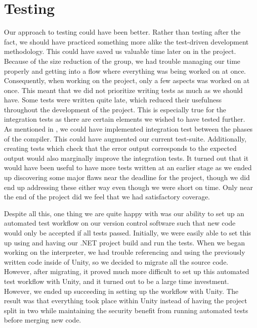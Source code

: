 \section{Testing}
Our approach to testing could have been better. Rather than testing after the fact, we should have practiced something more alike the test-driven development methodology. This could have saved us valuable time later on in the project.
Because of the size reduction of the group, we had trouble managing our time properly and getting into a flow where everything was being worked on at once.
Consequently, when working on the project, only a few aspects was worked on at once.
This meant that we did not prioritize writing tests as much as we should have. Some tests were written quite late, which reduced their usefulness throughout the development of the project. This is especially true for the integration tests as there are certain elements we wished to have tested further. 
As mentioned in , we could have implemented integration test between the phases of the compiler. This could have augmented our current test-suite. Additionally, creating tests which check that the error output corresponds to the expected output would also marginally improve the integration tests.
It turned out that it would have been useful to have more tests written at an earlier stage as we ended up discovering some major flaws near the deadline for the project, though we did end up addressing these either way even though we were short on time. 
Only near the end of the project did we feel that we had satisfactory coverage.

Despite all this, one thing we are quite happy with was our ability to set up an automated test workflow on our version control software such that new code would only be accepted if all tests passed.
Initially, we were easily able to set this up using and having our .NET project build and run the tests.
When we began working on the interpreter, we had trouble referencing and using the previously written code inside of Unity, so we decided to migrate all the source code.
However, after migrating, it proved much more difficult to set up this automated test workflow with Unity, and it turned out to be a large time investment.
However, we ended up succeeding in setting up the workflow with Unity.
The result was that everything took place within Unity instead of having the project split in two while maintaining the security benefit from running automated tests before merging new code.

